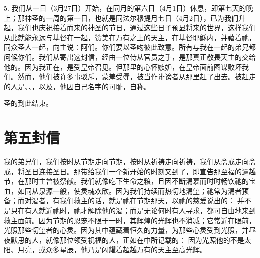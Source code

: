 5. 我们从一日（3月27日）开始，在同月的第六日（4月1日）休息，即第七天的晚上；那神圣的一周的第一日，也就是同法尔穆提月七日（4月2日），已为我们升起，我们也庆祝接着而来的神圣的节日，通过这些日子预显将来的世界，这样我们从此就能永远与基督在一起，赞美在万有之上的天主，在基督耶稣内，并藉着祂，同众圣人一起，向主说：阿们。你们要以圣吻彼此致意。所有与我在一起的弟兄都问候你们。我们从寄出这封信，经由一位侍从官员之手，是那真正敬畏天主的交给他的。因为我正在，是受皇帝召见。但那里的心怀嫉妒，在皇帝面前图谋败坏我们。然而，他们被许多事驳斥，蒙羞受辱，被当作诽谤者从那里赶了出去。被赶走的人是、、，以及，他因自己名字的可耻，自称。\par

圣的到此结束。\par



\section{第五封信}

\par

我的弟兄们，我们按时从节期走向节期，按时从祈祷走向祈祷，我们从斋戒走向斋戒，将圣日连接圣日。那带给我们一个新开始的时刻又到了，即宣告那至福的逾越节，在那时主曾被祭献。我们就像吃下生命之粮，且因不断渴慕而时时畅饮祂的宝血，如同从泉源一般，使灵魂欢欣。因为我们持续而热切地渴望；祂常为渴者预备；而对渴者，有我们救主的话，就是祂在节期那天，以祂的慈爱说出的： 并不是只在有人就近祂时，祂才解除他的渴；而是无论何时有人寻求，都可自由地来到救主面前。因为节期的恩宠不限于一时，其辉煌的光辉也不消减；它常近在眼前，光照那些切望者的心灵。因为其中蕴藏着恒久的力量，为那些心灵受到光照，并昼夜默思的人，就像那位领受祝福的人，正如在中所记载的： 因为光照他的不是太阳、月亮，或众多星辰，他乃是闪耀着超越万有的天主至高光辉。\par

